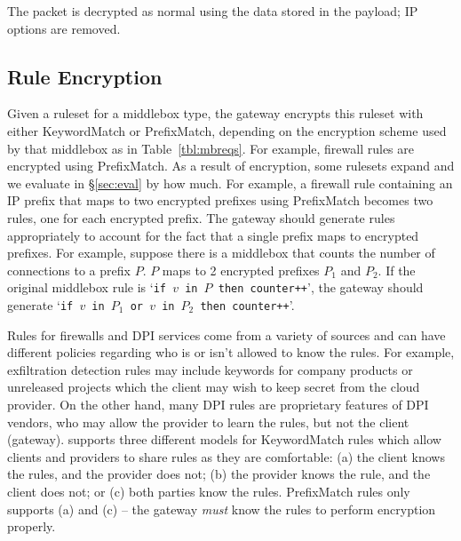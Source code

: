  The packet is decrypted as normal using the data stored in the payload; IP options are removed.



\subsection{Rule Encryption}
\label{sec:rulenc}

Given a ruleset for a middlebox type, the gateway encrypts this ruleset with either KeywordMatch or PrefixMatch, 
depending on the encryption scheme used by that middlebox as in Table~\ref{tbl:mbreqs}. For example, firewall 
rules are encrypted using PrefixMatch. As a result of encryption, some rulesets expand and we evaluate 
in \S\ref{sec:eval} by how much. For example, a firewall rule containing an IP prefix that maps 
to two encrypted prefixes using PrefixMatch becomes two rules, one for each encrypted prefix. The gateway should 
generate rules appropriately to account for the fact that a single prefix maps to encrypted prefixes. 
For example, suppose there is a middlebox that counts the number of connections to a prefix $P$. $P$ maps to
2 encrypted prefixes $P_1$ and $P_2$. If the original middlebox rule is `\texttt{if $v$ in $P$ then counter++}',
the gateway should generate `\texttt{if $v$ in $P_1$ or $v$ in $P_2$ then counter++}'.

Rules for firewalls and DPI services come from a variety of sources and can have different policies regarding who is or isn't allowed to know the rules. 
For example, exfiltration detection rules may include keywords for company products or unreleased projects which the client may wish to keep secret from the cloud provider. 
On the other hand, many DPI rules are proprietary features of DPI vendors, who may allow the provider to learn the rules, but not the client (gateway).
\sys supports three different models for KeywordMatch rules which allow clients and providers to share rules as they are comfortable: (a) the client knows the rules, and the provider does not; (b) the provider knows the rule, and the client does not; or (c) both parties know the rules.
PrefixMatch rules only supports (a) and (c) -- the gateway {\it must} know the rules to perform encryption properly.

